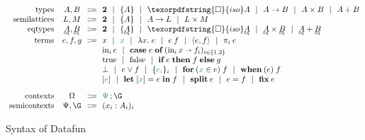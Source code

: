 \documentclass{rntz}\usepackage[a5]{rntzgeometry}\usepackage[fullwidth=130mm,width=330pt,]{narrow}
\newcommand\isocolor{\color{ForestGreen}} %
\newcommand\x\times
\newcommand\fn\lambda
\newcommand\injc{\text{in}}
\newcommand\inj[1]{\injc_{#1}\,}
\newcommand\bnfor{~~|~~}
\newcommand\bnfeq\Coloneqq
\newcommand\<{\mskip 4mu plus 4mu minus 1mu}
\newcommand\iso{{\texorpdfstring{\ensuremath{\square}}{iso}}}
\newcommand\isof{\iso}
\newcommand\fnspace{\;}
\newcommand\fnof[1]{\fn{#1}.\fnspace}
\newcommand\kwname\textbf
\newcommand\tset[1]{\{{#1}\}}
\newcommand\tbool{{\boldsymbol 2}}
\newcommand\efor[1]{\kwname{for}\:({#1})\fnspace}
\newcommand\ewhen[1]{\kwname{when}\:({#1})\fnspace}
\newcommand\ecase[1]{\kwname{case} \;{#1}\; \kwname{of}\;}
\newcommand\caseto\shortrightarrow
\newcommand\eset[1]{\{{#1}\}}
\newcommand\etrue{\mathrm{true}}
\newcommand\efalse{\mathrm{false}}
\newcommand\eif[2]{\kwname{if}\;{#1}\;\kwname{then}\;{#2}\;\kwname{else}\;}
\newcommand\ebox[1]{[{#1}]}
\newcommand\elet[1]{\kwname{let}\;#1\;\kwname{in}\;}
\newcommand\efix{\kwname{fix}\<}
\newcommand\eboxd[1]{\ebox{\isocolor #1}}
\newcommand\esetd[1]{\eset{\isocolor #1}}
\newcommand\eford[2]{\efor{{\isocolor #1} \in #2}}
\newcommand\etuple[1]{\langle{#1}\rangle}
\newcommand\splitsum{\kwname{split}\<}
\begin{document}
\begin{figure*}
  \[\setlength\arraycolsep{.33em}\begin{array}{r@{\hskip 1em}ccl}
    \text{types} & A,B &\bnfeq& \tbool \bnfor \tset{A} \bnfor
    \iso A \bnfor A \to B \bnfor A \x B \bnfor A + B
    \\
    \text{semilattices} & L,M &\bnfeq& \tbool \bnfor \tset{A} \bnfor
    A \to L \bnfor L \x M
    \\
    \text{eqtypes} & \eqt A, \eqt B &\bnfeq& \tbool \bnfor \tset{\eqt A} \bnfor
    \isof{\eqt A} \bnfor \eqt A \x \eqt B \bnfor \eqt A + \eqt B
    \\[.2em]
    \text{terms} & e,f,g &\bnfeq& x \bnfor {\isocolor x} \bnfor \fnof{x} e \bnfor e\<f
    \bnfor \etuple{e,f} \bnfor \pi_i\<e\\
    &&&\inj i e \bnfor \ecase{e} (\inj i x \caseto f_i)_{i\in\{1,2\}}\\
    &&&\etrue \bnfor \efalse \bnfor \eif e f g\\
    &&&\bot \bnfor e \vee f \bnfor \esetd{e_i}_i \bnfor \eford{x}{e} f
    \bnfor \ewhen e f\\
    &&& \eboxd e \bnfor \elet{\eboxd x = e} f \bnfor \splitsum e \bnfor \eeq{e}{f}
    \bnfor \efix e
    \\[2ex]
    \text{contexts} & \Omega &\bnfeq& \cxs\Psi\G
    \\
    \text{semicontexts} & \Psi,\G &\bnfeq& (x_i : A_i)_i
  \end{array}\]
  \caption{Syntax of Datafun}
  \label{fig:syntax}
\end{figure*}

\newcommand\J[3]{{#2} \vdash {#1} \mathrel{:} {#3}}
\newcommand\h[2]{{#1} : {#2}}
\end{document}
